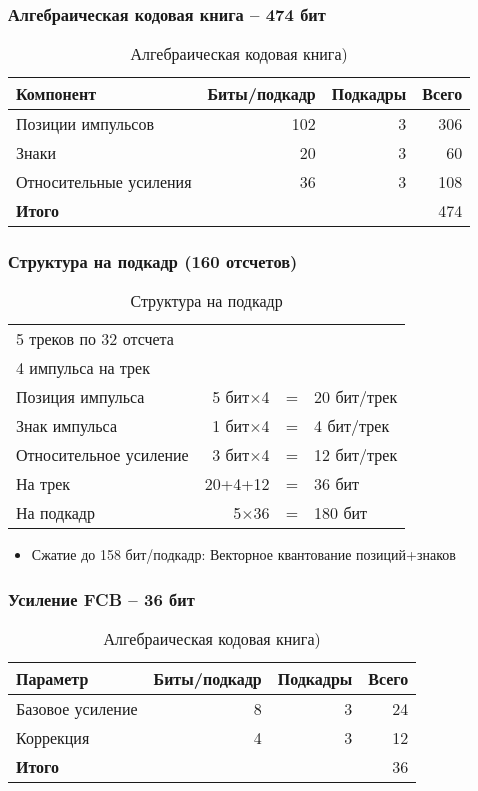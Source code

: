 \documentclass{report}
\begin{document}
	\subsubsection{Алгебраическая кодовая книга -- 474 бит}
	\begin{table}[H]
		\centering
		\caption{Алгебраическая кодовая книга)}
		\begin{tabular}{lrrr}
			\toprule
				\textbf{Компонент} & \textbf{Биты/подкадр} & \textbf{Подкадры} & \textbf{Всего} \\
			\midrule
				Позиции импульсов & 102 & 3 & 306 \\
				Знаки & 20 & 3 & 60 \\
				Относительные усиления & 36 & 3 & 108 \\
			\bottomrule
				\textbf{Итого} & & & 474 \\
			\bottomrule
		\end{tabular}
	\end{table}

	\subsubsection{Структура на подкадр (160 отсчетов)}
	\begin{table}[H]
		\centering
		\caption{Структура на подкадр}
		\begin{tabular}{lrcl}
			\toprule
				5 треков по 32 отсчета & & & \\
				4 импульса на трек & & & \\
				Позиция импульса & 5 бит$\times$4 & = & 20 бит/трек \\
				Знак импульса & 1 бит$\times$4 & = & 4 бит/трек \\
				Относительное усиление & 3 бит$\times$4 & = & 12 бит/трек \\
				На трек & 20+4+12 & = & 36 бит \\
				На подкадр & 5$\times$36 & = & 180 бит \\
			\bottomrule
		\end{tabular}
	\end{table}

	\begin{itemize}
		\item Сжатие до 158 бит/подкадр: Векторное квантование позиций+знаков
	\end{itemize}
	
	\subsubsection{Усиление FCB -- 36 бит}
	\begin{table}[H]
		\centering
		\caption{Алгебраическая кодовая книга)}
		\begin{tabular}{lrrr}
			\toprule
			\textbf{Параметр} & \textbf{Биты/подкадр} & \textbf{Подкадры} & \textbf{Всего} \\
			\midrule
			Базовое усиление & 8 & 3 & 24 \\
			Коррекция & 4 & 3 & 12 \\
			\bottomrule
			\textbf{Итого} & & & 36 \\
			\bottomrule
		\end{tabular}
	\end{table}
	
\end{document}
